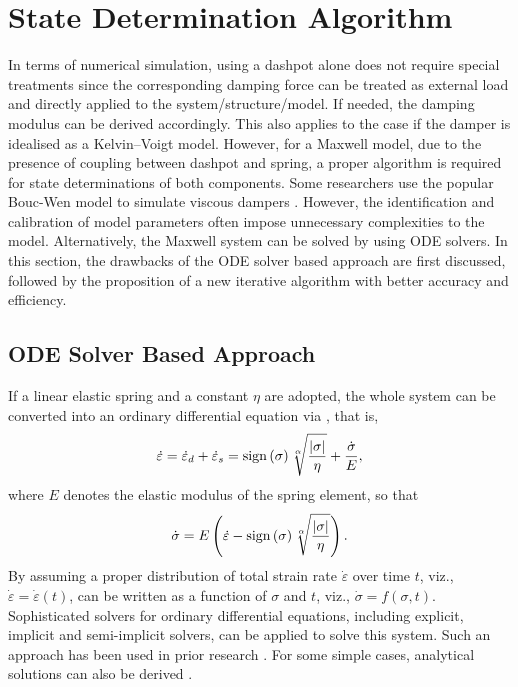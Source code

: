 \section{State Determination Algorithm}
In terms of numerical simulation, using a dashpot alone does not require special treatments since the corresponding damping force can be treated as external load and directly applied to the system/structure/model. If needed, the damping modulus can be derived accordingly. This also applies to the case if the damper is idealised as a Kelvin--Voigt model. However, for a Maxwell model, due to the presence of coupling between dashpot and spring, a proper algorithm is required for state determinations of both components. Some researchers use the popular Bouc-Wen \citep{Wen1976} model to simulate viscous dampers \citep[see, e.g.,][]{Gong2016,Chang2016}. However, the identification and calibration of model parameters often impose unnecessary complexities to the model. Alternatively, the Maxwell system can be solved by using ODE solvers. In this section, the drawbacks of the ODE solver based approach are first discussed, followed by the proposition of a new iterative algorithm with better accuracy and efficiency.
\subsection{ODE Solver Based Approach}\label{sec:ode_issue}
If a linear elastic spring and a constant $\eta$ are adopted, the whole system can be converted into an ordinary differential equation via , that is,
\begin{gather}
\dot\varepsilon=\dot\varepsilon_d+\dot\varepsilon_s=\mathrm{sign}\left(\sigma\right)\sqrt[\alpha]{\dfrac{\left\vert\sigma\right\vert}{\eta}}+\dfrac{\dot\sigma}{E},
\end{gather}
where $E$ denotes the elastic modulus of the spring element, so that
\begin{gather}\label{eq:maxwell_ode}
\dot\sigma=E\left(\dot\varepsilon-\mathrm{sign}\left(\sigma\right)\sqrt[\alpha]{\dfrac{\left\vert\sigma\right\vert}{\eta}}\right).
\end{gather}
By assuming a proper distribution of total strain rate $\dot\varepsilon$ over time $t$, viz., $\dot\varepsilon=\dot\varepsilon(t)$,  can be written as a function of $\sigma$ and $t$, viz., $\dot\sigma=f(\sigma,t)$. Sophisticated solvers for ordinary differential equations, including explicit, implicit and semi-implicit solvers, can be applied to solve this system. Such an approach has been used in prior research \citep[see, e.g.,][]{Kasai2004,Akcelyan2018}. For some simple cases, analytical solutions can also be derived \citep[e.g.,][]{Hatada2000}.

